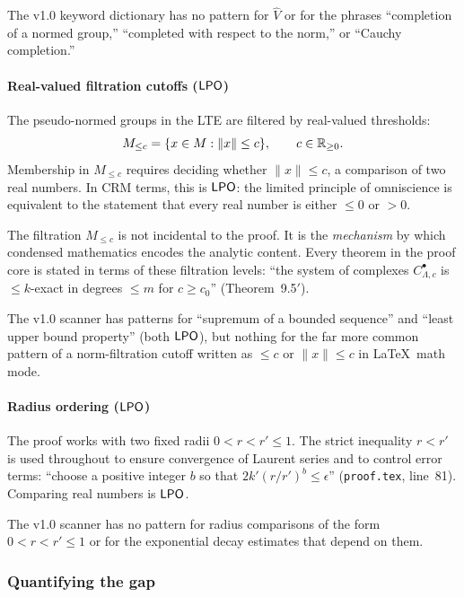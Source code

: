 The v1.0 keyword dictionary has no pattern for $\widehat{V}$ or for
the phrases ``completion of a normed group,'' ``completed with respect
to the norm,'' or ``Cauchy completion.''

\paragraph{Real-valued filtration cutoffs ($\textsf{LPO}$)}

The pseudo-normed groups in the LTE are filtered by real-valued
thresholds:
\[
  M_{\leq c} = \{x \in M : \|x\| \leq c\}, \qquad c \in \mathbb{R}_{\geq 0}.
\]
Membership in $M_{\leq c}$ requires deciding whether $\|x\| \leq c$,
a comparison of two real numbers.  In CRM terms, this is $\textsf{LPO}$: the
limited principle of omniscience is equivalent to the statement that
every real number is either $\leq 0$ or $> 0$.

The filtration $M_{\leq c}$ is not incidental to the proof.  It is
the \emph{mechanism} by which condensed mathematics encodes the
analytic content.  Every theorem in the proof core is stated in terms
of these filtration levels: ``the system of complexes
$C^\bullet_{\Lambda,c}$ is $\leq k$-exact in degrees $\leq m$
for $c \geq c_0$'' (Theorem~9.5$'$).

The v1.0 scanner has patterns for ``supremum of a bounded sequence''
and ``least upper bound property'' (both $\textsf{LPO}$), but nothing for
the far more common pattern of a norm-filtration cutoff written as
$\leq c$ or $\|x\| \leq c$ in \LaTeX\ math mode.

\paragraph{Radius ordering ($\textsf{LPO}$)}

The proof works with two fixed radii $0 < r < r' \leq 1$.  The
strict inequality $r < r'$ is used throughout to ensure convergence
of Laurent series and to control error terms: ``choose a positive
integer $b$ so that $2k'(r/r')^b \leq \epsilon$'' (\texttt{proof.tex},
line~81).  Comparing real numbers is $\textsf{LPO}$.

The v1.0 scanner has no pattern for radius comparisons of the form
$0 < r < r' \leq 1$ or for the exponential decay estimates that
depend on them.

\subsubsection{Quantifying the gap}\label{sec:gap}

